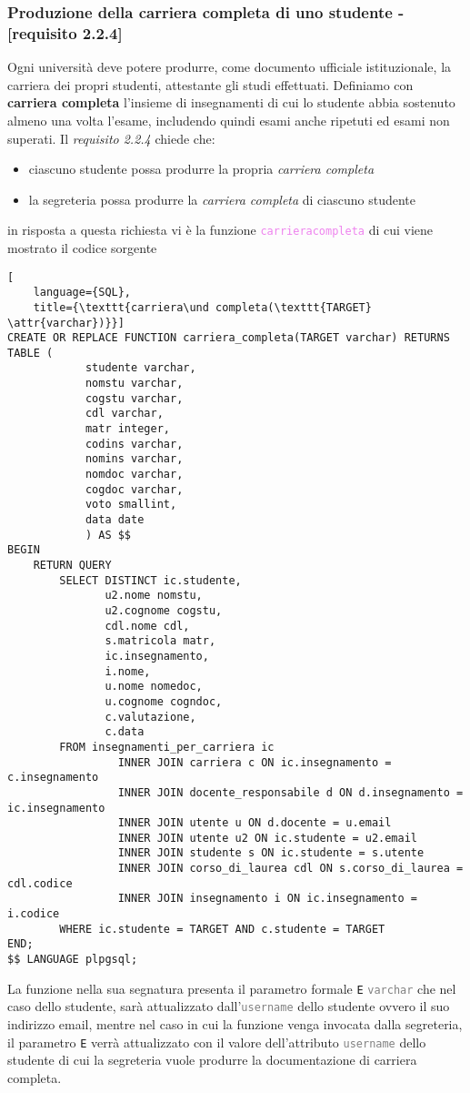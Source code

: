 \documentclass{article}
\newcommand{\attr}[1]{\texttt{\textcolor{gray}{#1}}}
\newcommand{\sqlfunc}[1]{\texttt{\textcolor{violet}{#1}}}
\newcommand{\und}[0]{\textunderscore}
\begin{document}
\subsubsection{Produzione della carriera completa di uno studente - [requisito 2.2.4]}
Ogni università deve potere produrre, come documento ufficiale istituzionale, la carriera dei propri studenti, attestante gli studi effettuati. Definiamo con \textbf{carriera completa} l'insieme di insegnamenti di cui lo studente abbia sostenuto almeno una volta l'esame, includendo quindi esami anche ripetuti ed esami non superati.
Il \textit{requisito 2.2.4} chiede che:
\begin{itemize}
    \item ciascuno studente possa produrre la propria \textit{carriera completa}
    \item la segreteria possa produrre la \textit{carriera completa} di ciascuno studente
\end{itemize}
in risposta a questa richiesta vi è la funzione \sqlfunc{carriera\und completa} di cui viene mostrato il codice sorgente
\begin{lstlisting}[
    language={SQL},
    title={\texttt{carriera\und completa(\texttt{TARGET} \attr{varchar})}}]
CREATE OR REPLACE FUNCTION carriera_completa(TARGET varchar) RETURNS TABLE (
            studente varchar,
            nomstu varchar,
            cogstu varchar,
            cdl varchar,
            matr integer,
            codins varchar,
            nomins varchar,
            nomdoc varchar,
            cogdoc varchar,
            voto smallint,
            data date
            ) AS $$
BEGIN
    RETURN QUERY
        SELECT DISTINCT ic.studente,
               u2.nome nomstu,
               u2.cognome cogstu,
               cdl.nome cdl,
               s.matricola matr,
               ic.insegnamento,
               i.nome,
               u.nome nomedoc,
               u.cognome cogndoc,
               c.valutazione,
               c.data
        FROM insegnamenti_per_carriera ic
                 INNER JOIN carriera c ON ic.insegnamento = c.insegnamento
                 INNER JOIN docente_responsabile d ON d.insegnamento = ic.insegnamento
                 INNER JOIN utente u ON d.docente = u.email
                 INNER JOIN utente u2 ON ic.studente = u2.email
                 INNER JOIN studente s ON ic.studente = s.utente
                 INNER JOIN corso_di_laurea cdl ON s.corso_di_laurea = cdl.codice
                 INNER JOIN insegnamento i ON ic.insegnamento = i.codice
        WHERE ic.studente = TARGET AND c.studente = TARGET
END;
$$ LANGUAGE plpgsql;
\end{lstlisting}
La funzione nella sua segnatura presenta il parametro formale \texttt{E} \attr{varchar} che nel caso dello studente, sarà attualizzato dall'\attr{username} dello studente ovvero il suo indirizzo email, mentre nel caso in cui la funzione venga invocata dalla segreteria, il parametro \texttt{E} verrà attualizzato con il valore dell'attributo \attr{username} dello studente di cui la segreteria vuole produrre la documentazione di carriera completa.
\end{document}
